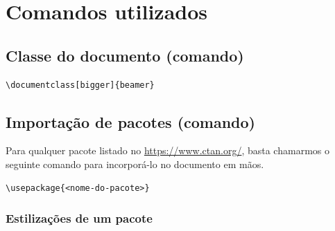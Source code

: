 \documentclass[11pt]{article}
\date{\today}
\title{}
\begin{document}
\tableofcontents


\section{Comandos utilizados}
\label{sec:orgd6fb0e9}
\subsection{Classe do documento (comando)}
\label{sec:org84fe096}
\begin{verbatim}
\documentclass[bigger]{beamer}
\end{verbatim}

\subsection{Importação de pacotes (comando)}
\label{sec:orgde9c935}

Para qualquer pacote listado no \url{https://www.ctan.org/}, basta chamarmos
o seguinte comando para incorporá-lo no documento em mãos.

\begin{verbatim}
\usepackage{<nome-do-pacote>}
\end{verbatim}

\subsubsection{Estilizações de um pacote}
\label{sec:orgd86dd73}
\end{document}
